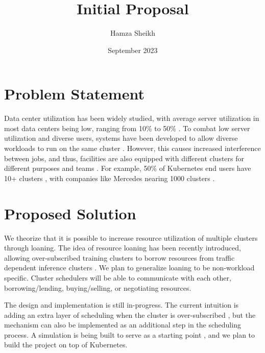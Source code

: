 \documentclass{article}
\title{Initial Proposal}
\author{Hamza Sheikh}
\date{September 2023}
\begin{document}
\maketitle
\section{Problem Statement}
Data center utilization has been widely studied, with average server utilization in most data centers being low, ranging from 10\% to 50\%
\cite{lo_heracles_2015}. To combat low server utilization and diverse users, systems have been developed to allow diverse workloads to run on the same cluster \cite{bhattacharya_hierarchical_2013, hindman_mesos_nodate}. However, this causes increased interference between jobs, and thus, facilities are also equipped with different clusters for different purposes and teams \cite{patel_what_2022, li_lyra_2023}. For example, 50\% of Kubernetes \cite{verma_large-scale_2015}
end users have 10+ clusters \cite{noauthor_cncf_2023} 
, with companies like Mercedes nearing 1000 clusters \cite{noauthor_mercedes-benz_2023}.

\section{Proposed Solution}
We theorize that it is possible to increase resource utilization of multiple clusters through loaning. The idea of resource loaning has been recently introduced, allowing over-subscribed training clusters to borrow resources from traffic dependent inference clusters \cite{li_lyra_2023}.
We plan to generalize loaning to be non-workload specific. Cluster schedulers will be able to communicate with each other, borrowing/lending, buying/selling, or negotiating resources.
\newline

\noindent The design and implementation is still in-progress. The current intuition is adding an extra layer of scheduling when the cluster is over-subscribed \cite{zaharia_delay_2010}, but the mechanism can also be implemented as an additional step in the scheduling process. A simulation is being built to serve as a starting point \cite{sched-github}, and we plan to build the project on top of Kubernetes.


\end{document}
